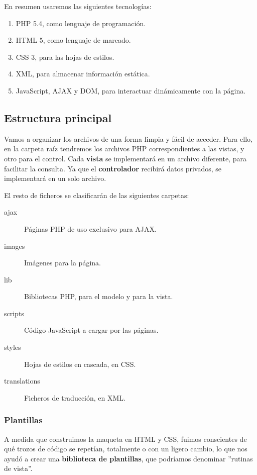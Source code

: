 En resumen usaremos las siguientes tecnologías:

\begin{enumerate}
	\item PHP 5.4, como lenguaje de programación.
	\item \acrshort{HTML} 5, como lenguaje de marcado.
	\item \acrshort{CSS} 3, para las hojas de estilos.
	\item \acrshort{XML}, para almacenar información estática.
	\item JavaScript, \acrshort{AJAX} y \acrshort{DOM}, para interactuar dinámicamente con la página.
\end{enumerate}

\subsection{Estructura principal}

Vamos a organizar los archivos de una forma limpia y fácil de acceder. Para ello, en la carpeta raíz tendremos los archivos PHP correspondientes a las vistas, y otro para el control. Cada \textbf{vista} se implementará en un archivo diferente, para facilitar la consulta. Ya que el \textbf{controlador} recibirá datos privados, se implementará en un solo archivo.

El resto de ficheros se clasificarán de las siguientes carpetas:

\begin{description}
	\item[ajax] Páginas PHP de uso exclusivo para \acrshort{AJAX}.
	\item[images] Imágenes para la página.
	\item[lib] Bibliotecas PHP, para el modelo y para la vista.
	\item[scripts] Código JavaScript a cargar por las páginas.
	\item[styles] Hojas de estilos en cascada, en \acrshort{CSS}.
	\item[translations] Ficheros de traducción, en \acrshort{XML}.
\end{description}

\subsubsection{Plantillas}

A medida que construimos la maqueta en \acrshort{HTML} y \acrshort{CSS}, fuimos conscientes de qué trozos de código se repetían, totalmente o con un ligero cambio, lo que nos ayudó a crear una \textbf{biblioteca de plantillas}, que podríamos denominar ''rutinas de vista''.

